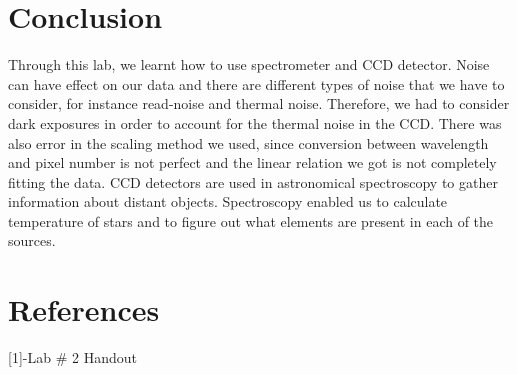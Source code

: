 \documentclass[letterpaper,12pt]{article}
\begin{document}
\section{Conclusion}
\label{conclusion}
Through this lab, we learnt how to use spectrometer and CCD detector. Noise can have effect on our data and there are different types of noise that we have to consider, for instance read-noise and thermal noise. Therefore, we had to consider dark exposures in order to account for the thermal noise in the CCD. There was also error in the scaling method we used, since conversion between wavelength and pixel number is not perfect and the linear relation we got is not completely fitting the data.
CCD detectors are used in astronomical spectroscopy to gather information about distant objects. Spectroscopy enabled us to calculate temperature of stars and to figure out what elements are present in each of the sources.




\section{References}
\label{references}
[1]-Lab \# 2 Handout
\end{document}
